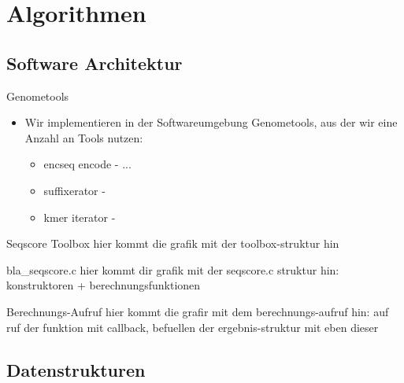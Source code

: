 \documentclass[xcolor=dvipsnames, aspectratio=1610]{beamer}
\begin{document}
\section{Algorithmen}

\subsection{Software Architektur}

\begin{frame}{Genometools}
  \begin{itemize}
    \item Wir implementieren in der Softwareumgebung Genometools, aus der wir eine Anzahl an Tools nutzen:
    \begin{itemize}
      \item encseq encode - ...
      \item suffixerator -
      \item kmer iterator -
    \end{itemize}    
  \end{itemize}
\end{frame}

\begin{frame}{Seqscore Toolbox}
  hier kommt die grafik mit der toolbox-struktur hin
\end{frame}

\begin{frame}{bla\_seqscore.c}
  hier kommt dir grafik mit der seqscore.c struktur hin: konstruktoren + berechnungsfunktionen
\end{frame}

\begin{frame}{Berechnungs-Aufruf}
  hier kommt die grafir mit dem berechnungs-aufruf hin: auf ruf der funktion mit callback, befuellen der ergebnis-struktur mit eben dieser
\end{frame}

\subsection{Datenstrukturen}
\end{document}
